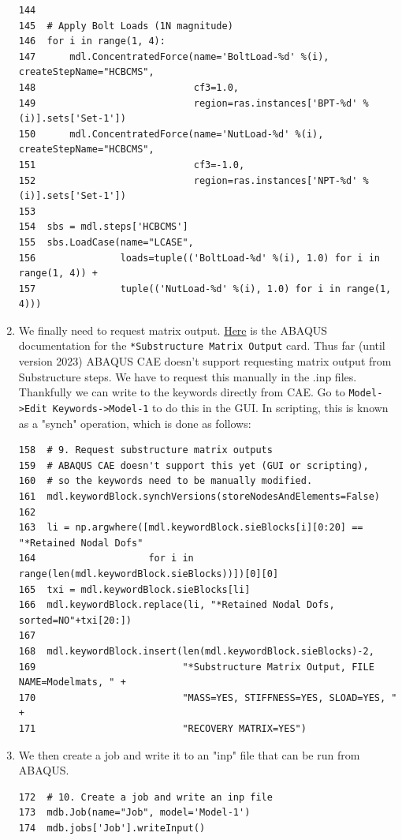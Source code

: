 \documentclass[11pt]{article}
\begin{document}
\begin{enumerate}
\begin{verbatim}
144  
145  # Apply Bolt Loads (1N magnitude)
146  for i in range(1, 4):
147      mdl.ConcentratedForce(name='BoltLoad-%d' %(i), createStepName="HCBCMS",
148                            cf3=1.0,
149                            region=ras.instances['BPT-%d' %(i)].sets['Set-1'])
150      mdl.ConcentratedForce(name='NutLoad-%d' %(i), createStepName="HCBCMS",
151                            cf3=-1.0,
152                            region=ras.instances['NPT-%d' %(i)].sets['Set-1'])
153  
154  sbs = mdl.steps['HCBCMS']
155  sbs.LoadCase(name="LCASE",
156               loads=tuple(('BoltLoad-%d' %(i), 1.0) for i in range(1, 4)) +
157               tuple(('NutLoad-%d' %(i), 1.0) for i in range(1, 4)))
\end{verbatim}
\item We finally need to request matrix output.
\href{https://classes.engineering.wustl.edu/2009/spring/mase5513/abaqus/docs/v6.6/books/key/default.htm?startat=ch18abk43.html}{Here} is the ABAQUS documentation for the \texttt{*Substructure Matrix Output} card.
Thus far (until version 2023) ABAQUS CAE doesn't support requesting matrix output from Substructure steps.
We have to request this manually in the .inp files.
Thankfully we can write to the keywords directly from CAE.
Go to \texttt{Model->Edit Keywords->Model-1} to do this in the GUI.
In scripting, this is known as a "synch" operation, which is done as follows:
\begin{verbatim}
158  # 9. Request substructure matrix outputs
159  # ABAQUS CAE doesn't support this yet (GUI or scripting),
160  # so the keywords need to be manually modified.
161  mdl.keywordBlock.synchVersions(storeNodesAndElements=False)
162  
163  li = np.argwhere([mdl.keywordBlock.sieBlocks[i][0:20] == "*Retained Nodal Dofs"
164                    for i in range(len(mdl.keywordBlock.sieBlocks))])[0][0]
165  txi = mdl.keywordBlock.sieBlocks[li]
166  mdl.keywordBlock.replace(li, "*Retained Nodal Dofs, sorted=NO"+txi[20:])
167  
168  mdl.keywordBlock.insert(len(mdl.keywordBlock.sieBlocks)-2, 
169                          "*Substructure Matrix Output, FILE NAME=Modelmats, " +
170                          "MASS=YES, STIFFNESS=YES, SLOAD=YES, " +
171                          "RECOVERY MATRIX=YES")
\end{verbatim}
\item We then create a job and write it to an "inp" file that can be run from ABAQUS.
\begin{verbatim}
172  # 10. Create a job and write an inp file
173  mdb.Job(name="Job", model='Model-1')
174  mdb.jobs['Job'].writeInput()

\end{verbatim}
\end{enumerate}
\end{document}
